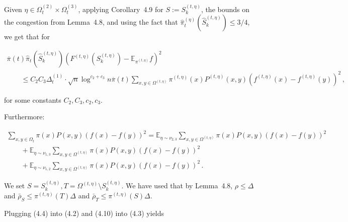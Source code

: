 Given $\eta\in\Omega_{t}^{(2)}\times\Omega_{t}^{(3)}$, applying Corollary 4.9 for $S:=S_{k}^{(t,\eta)}$, the bounds on the congestion from Lemma 4.8, and using the fact that $\hat{\pi}_{t}^{(\eta)}(\hat{S}_{k}^{(t,\eta)})\leq 3/4$, we get that for\par


\[\begin{gathered}
\displaystyle\overline{\pi}(t)\hat{\pi}_{t}\left(\hat{S}_{k}^{(t,\eta)}\right)\left(F^{(t,\eta)}(S_{k}^{(t,\eta)})-\mathbb{E}_{\pi^{(t,\eta)}}f\right)^{2} \\
\displaystyle\qquad\leq C_{2}C_{3}\Delta_{t}^{(1)}\cdot\sqrt{n}\log^{c_{2}+c_{3}}n\overline{\pi}(t)\sum_{x,y\in\Omega^{(t,\eta)}}\pi^{(t,\eta)}(x)P^{(t,\eta)}(x,y)(f^{(t,\eta)}(x)-f^{(t,\eta)}(y))^{2}\,,
\end{gathered}\]


for some constants $C_{2},C_{3},c_{2},c_{3}$.\par




Furthermore:\par


\[\begin{gathered}
\displaystyle\sum_{x,y\in\Omega_{t}}\pi(x)P(x,y)(f(x)-f(y))^{2} \displaystyle=\mathbb{E}_{\eta\sim\nu_{2,3}}\sum_{x,y\in\Omega^{(t,\eta)}}\pi(x)P(x,y)(f(x)-f(y))^{2} \\
\displaystyle\qquad+\mathbb{E}_{\eta\sim\nu_{1,3}}\sum_{x,y\in\Omega^{(t,\eta)}}\pi(x)P(x,y)(f(x)-f(y))^{2} \\
\displaystyle\qquad+\mathbb{E}_{\eta\sim\nu_{1,2}}\sum_{x,y\in\Omega^{(t,\eta)}}\pi(x)P(x,y)(f(x)-f(y))^{2}\,.
\end{gathered}\]




We set $S=S_{k}^{(t,\eta)},T=\Omega^{(t,\eta)}\setminus S_{k}^{(t,\eta)}$. We have used that by Lemma 4.8, $\rho\leq\Delta$ and $\bar{\rho}_{S}\leq\pi^{(t,\eta)}(T)\Delta$ and $\bar{\rho}_{T}\leq\pi^{(t,\eta)}(S)\Delta$.\par




Plugging (4.4) into (4.2) and (4.10) into (4.3) yields\par


